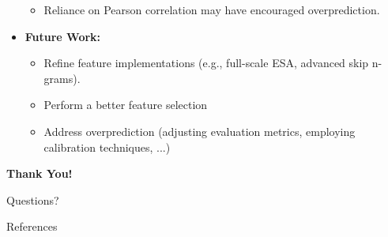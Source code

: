 \documentclass{beamer}
\begin{document}
\begin{frame}[allowframebreaks]
\begin{itemize}
\begin{itemize}
      \item Reliance on Pearson correlation may have encouraged overprediction.
    \end{itemize}
    \vspace{0.3cm}
    \item \textbf{Future Work:}
    \begin{itemize}
      \item Refine feature implementations (e.g., full-scale ESA, advanced skip n-grams).
      \item Perform a better feature selection
      \item Address overprediction (adjusting evaluation metrics, employing calibration techniques, ...)
    \end{itemize}
  \end{itemize}
\end{frame}

\begin{frame}
\begin{center}
\Huge\textbf{Thank You!}
\vspace{1cm}


\Large Questions?
\end{center}
\end{frame}

\begin{frame}[allowframebreaks]{References}



\end{frame}
\end{document}
